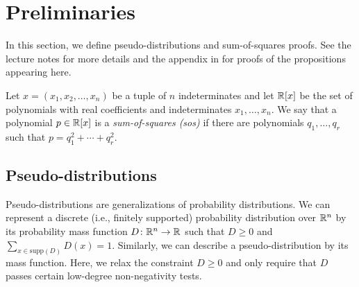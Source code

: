 
\section{Preliminaries}
\label{sec:preliminaries}



In this section, we define pseudo-distributions and sum-of-squares proofs.
See the lecture notes \cite{BarakS16} for more details and the appendix in \cite{DBLP:conf/focs/MaSS16} for proofs of the propositions appearing here.

Let $x = (x_1, x_2, \ldots, x_n)$ be a tuple of $n$ indeterminates and let $\mathbb R[x]$ be the set of polynomials with real coefficients and indeterminates $x_1,\ldots,x_n$.
We say that a polynomial $p\in \mathbb R[x]$ is a \emph{sum-of-squares (sos)} if there are polynomials $q_1,\ldots,q_r$ such that $p=q_1^2 + \cdots + q_r^2$.

\subsection{Pseudo-distributions}

Pseudo-distributions are generalizations of probability distributions.
We can represent a discrete (i.e., finitely supported) probability distribution over $\mathbb R^n$ by its probability mass function $D\colon \mathbb R^n \to \mathbb R$ such that $D \geq 0$ and $\sum_{x \in \mathrm{supp}(D)} D(x) = 1$.
Similarly, we can describe a pseudo-distribution by its mass function.
Here, we relax the constraint $D\ge 0$ and only require that $D$ passes certain low-degree non-negativity tests.

